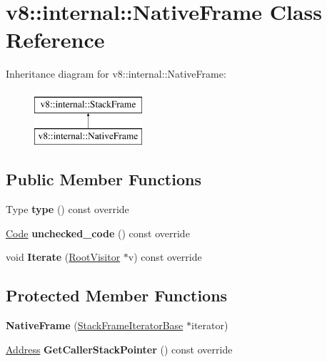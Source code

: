 \hypertarget{classv8_1_1internal_1_1NativeFrame}{}\section{v8\+:\+:internal\+:\+:Native\+Frame Class Reference}
\label{classv8_1_1internal_1_1NativeFrame}
Inheritance diagram for v8\+:\+:internal\+:\+:Native\+Frame\+:\begin{figure}[H]
\begin{center}
\leavevmode
\includegraphics[height=2.000000cm]{classv8_1_1internal_1_1NativeFrame}
\end{center}
\end{figure}
\subsection*{Public Member Functions}
\begin{DoxyCompactItemize}
\item 
\mbox{\label{classv8_1_1internal_1_1NativeFrame_a61004a74a136cbf22cb0f5d5c5cfe5b2}} 
Type {\bfseries type} () const override
\item 
\mbox{\label{classv8_1_1internal_1_1NativeFrame_a457c12452a7a1d6d9a2da49f51d9f4bf}} 
\mbox{\hyperlink{classv8_1_1internal_1_1Code}{Code}} {\bfseries unchecked\+\_\+code} () const override
\item 
\mbox{\label{classv8_1_1internal_1_1NativeFrame_a779ef2a98e6f36125e86085f73efe673}} 
void {\bfseries Iterate} (\mbox{\hyperlink{classv8_1_1internal_1_1RootVisitor}{Root\+Visitor}} $\ast$v) const override
\end{DoxyCompactItemize}
\subsection*{Protected Member Functions}
\begin{DoxyCompactItemize}
\item 
\mbox{\label{classv8_1_1internal_1_1NativeFrame_ab15b700b354dbe3a88fe0e73146838c3}} 
{\bfseries Native\+Frame} (\mbox{\hyperlink{classv8_1_1internal_1_1StackFrameIteratorBase}{Stack\+Frame\+Iterator\+Base}} $\ast$iterator)
\item 
\mbox{\label{classv8_1_1internal_1_1NativeFrame_ac530a88955b5357186050e910d4ba160}} 
\mbox{\hyperlink{classuintptr__t}{Address}} {\bfseries Get\+Caller\+Stack\+Pointer} () const override
\end{DoxyCompactItemize}
